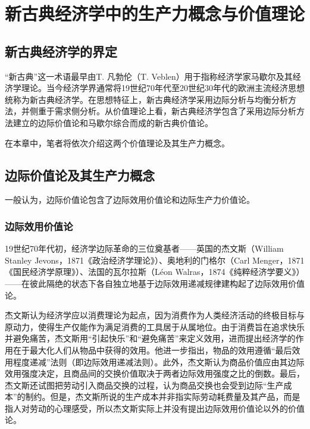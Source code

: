 
\chapter{新古典经济学中的生产力概念与价值理论}

\section{新古典经济学的界定}

“新古典”这一术语最早由T. 凡勃伦（T. Veblen）用于指称经济学家马歇尔及其经济学理论\cite[9382]{macmillanpublishersltdNewPalgraveDictionary2018}。当今经济学界通常将19世纪70年代至20世纪30年代的欧洲主流经济思想统称为新古典经济学\cite[241]{YanZhiJieXiFangJingJiXueShuoShiJiaoChengDiErBan2013}。在思想特征上，新古典经济学采用边际分析与均衡分析方法，并侧重于需求侧分析。从价值理论上看，新古典经济学包含了采用边际分析方法建立的边际价值论和马歇尔综合而成的新古典价值论\cite[181-184]{CaiJiMingCongGuDianZhengZhiJingJiXueDaoZhongGuoTeSeSheHuiZhuYiZhengZhiJingJiXueJiYuZhongGuoShiJiaoDeZhengZhiJingJiXueYanBianShangCe2023}。

在本章中，笔者将依次介绍这两个价值理论及其生产力概念。

\section{边际价值论及其生产力概念}

一般认为，边际价值论包含了边际效用价值论和边际生产力价值论\cite[181]{CaiJiMingCongGuDianZhengZhiJingJiXueDaoZhongGuoTeSeSheHuiZhuYiZhengZhiJingJiXueJiYuZhongGuoShiJiaoDeZhengZhiJingJiXueYanBianShangCe2023}。

\subsection{边际效用价值论}

19世纪70年代初，经济学边际革命的三位奠基者——英国的杰文斯（William Stanley Jevons，1871《政治经济学理论》）、奥地利的门格尔（Carl Menger，1871《国民经济学原理》）、法国的瓦尔拉斯（Léon Walras，1874《纯粹经济学要义》）——在彼此隔绝的状态下各自独立地基于边际效用递减规律建构起了边际效用价值论\cite[iii]{r.d.c.BuLaiKeJingJiXueDeBianJiGeMingShuoMingHePingJie2020}\cite[242]{YanZhiJieXiFangJingJiXueShuoShiJiaoChengDiErBan2013}。

杰文斯认为经济学应以消费理论为起点，因为消费作为人类经济活动的终极目标与原动力，使得生产仅能作为满足消费的工具居于从属地位。由于消费旨在追求快乐并避免痛苦，杰文斯用“引起快乐”和“避免痛苦”来定义效用，进而提出经济学的作用在于最大化人们从物品中获得的效用。他进一步指出，物品的效用遵循“最后效用程度递减”法则（即边际效用递减法则）。此外，杰文斯认为商品价值应由其边际效用强度决定，且商品间的交换价值取决于两者边际效用强度之比的倒数。最后，杰文斯还试图把劳动引入商品交换的过程，认为商品交换也会受到边际“生产成本”的制约。但是，杰文斯所说的生产成本并非指实际劳动耗费量及其产品，而是指人对劳动的心理感受，所以杰文斯实际上并没有提出边际效用价值论以外的价值论。\cite[125-136，142-149]{YanZhiJieCongBianJiGeMingDaoKaiEnSiGeMing2022}\cite[52-131]{SiTanLi*JieWenSiZhengZhiJingJiXueLiLun1984}

